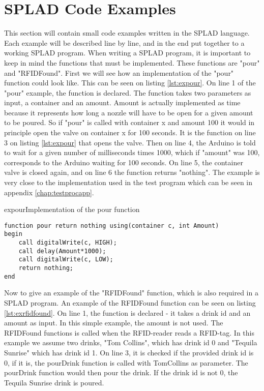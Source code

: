 \section{SPLAD Code Examples}
This section will contain small code examples written in the SPLAD language. Each example will be described line by line, and in the end put together to a working SPLAD program.
When writing a SPLAD program, it is important to keep in mind the functions that must be implemented. These functions are "pour" and "RFIDFound". First we will see how an implementation of the "pour" function could look like. This can be seen on listing \ref{lst:expour}. On line 1 of the "pour" example, the function is declared. The function takes two parameters as input, a container and an amount. Amount is actually implemented as time because it represents how long a nozzle will have to be open for a given amount to be poured. So if "pour" is called with container x and amount 100 it would in principle open the valve on container x for 100 seconds. It is the function on line 3 on listing \ref{lst:expour} that opens the valve. Then on line 4, the Arduino is told to wait for a given number of milliseconds times 1000, which if "amount" was 100, corresponds to the Arduino waiting for 100 seconds. On line 5, the container valve is closed again, and on line 6 the function returns "nothing". The example is very close to the implementation used in the test program which can be seen in appendix \ref{chap:testprocapp}.

\begin{code}{expour}{Implementation of the pour function}
\begin{lstlisting}
function pour return nothing using(container c, int Amount)
begin
	call digitalWrite(c, HIGH);
	call delay(Amount*1000);
	call digitalWrite(c, LOW);
	return nothing;
end
\end{lstlisting}
\end{code}

Now to give an example of the "RFIDFound" function, which is also required in a SPLAD program. An example of the RFIDFound function can be seen on listing \ref{lst:exrfidfound}. On line 1, the function is declared - it takes a drink id and an amount as input. In this simple example, the amount is not used. The RFIDFound functions is called when the RFID-reader reads a RFID-tag. In this example we assume two drinks, "Tom Collins", which has drink id 0 and "Tequila Sunrise" which has drink id 1. On line 3, it is checked if the provided drink id is 0, if it is, the pourDrink function is called with TomCollins as parameter. The pourDrink function would then pour the drink. If the drink id is not 0, the Tequila Sunrise drink is poured.   

